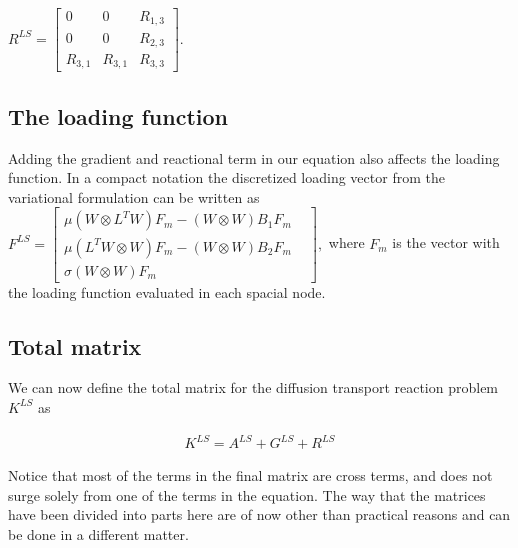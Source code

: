 $
R^{LS}=
\begin{bmatrix}
	0 & 0	 &	R_{1,3}   \\
	0 & 0	 &	R_{2,3}   \\
	R_{3,1} & R_{3,1} & R_{3,3} 
\end{bmatrix}.
$

\subsection{The loading function}
Adding the gradient and reactional term in our equation also affects the loading function. In a compact notation the discretized loading vector from the variational formulation can be written as
$
F^{LS}=
\begin{bmatrix}
	\mu(W \otimes L^T W)F_m - (W \otimes W)B_1F_m \\
	\mu(L^TW \otimes W)F_m - (W \otimes W)B_2F_m \\
	\sigma(W\otimes W)F_m & 
	\label{mat:FLS}
\end{bmatrix},
$
where $F_m$ is the vector with the loading function evaluated in each spacial node.
%

\subsection{Total matrix}
We can now define the total matrix for the diffusion transport reaction problem $K^{LS}$ as

\begin{align}
	K^{LS} = A^{LS} + G^{LS} + R^{LS}
	\label{eq:difftransMatrixSum}
\end{align}
%

Notice that most of the terms in the final matrix are cross terms, and does not surge solely from one of the terms in the equation. The way that the matrices have been divided into parts here are of now other than practical reasons and can be done in a different matter.  

